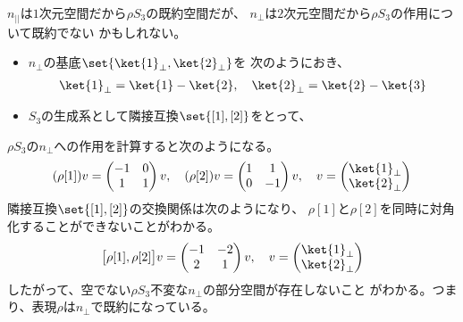 	$n_{||}$は$1$次元空間だから$\rho S_3$の既約空間だが、
	$n_{\perp}$は$2$次元空間だから$\rho S_3$の作用について既約でない
	かもしれない。
	\begin{itemize}\setlength{\itemsep}{-1mm} %
		\item $n_{\perp}$の基底$\set{\ket{1}_\perp,\ket{2}_\perp}$を
		次のようにおき、
		\begin{equation*}\begin{split} %
			\ket{1}_\perp=\ket{1}-\ket{2},\quad \ket{2}_\perp=\ket{2}-\ket{3}
		\end{split}\end{equation*} %
		\item $S_3$の生成系として隣接互換$\set{[1],[2]}$をとって、
	\end{itemize} %
	$\rho S_3$の$n_{\perp}$への作用を計算すると次のようになる。
	\begin{equation*}\begin{split} %
		(\rho[1])v = \begin{pmatrix}
			-1 & 0 \\ 1 & 1
		\end{pmatrix}v,\quad (\rho[2])v = \begin{pmatrix}
			1 & 1 \\ 0 & -1
		\end{pmatrix}v,\quad v = \begin{pmatrix}
			\ket{1}_\perp \\ \ket{2}_\perp
		\end{pmatrix}
	\end{split}\end{equation*} %
	隣接互換$\set{[1],[2]}$の交換関係は次のようになり、
	$\rho[1]$と$\rho[2]$を同時に対角化することができないことがわかる。
	\begin{equation*}\begin{split} %
		\bigl[\rho[1],\rho[2]\bigr]v = \begin{pmatrix}
			-1 & -2 \\ 2 & 1
		\end{pmatrix}v,\quad v = \begin{pmatrix}
			\ket{1}_\perp \\ \ket{2}_\perp
		\end{pmatrix}
	\end{split}\end{equation*} %
	したがって、空でない$\rho S_3$不変な$n_\perp$の部分空間が存在しないこと
	がわかる。つまり、表現$\rho$は$n_\perp$で既約になっている。

